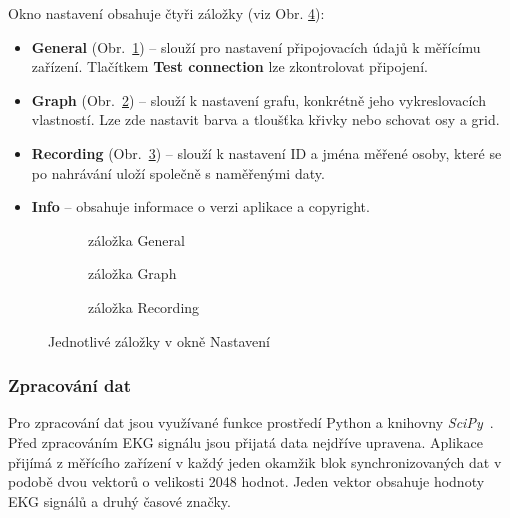 Okno nastavení obsahuje čtyři záložky (viz Obr. \ref{fig:settings_cards}):
\begin{itemize}
    \item \textbf{General} (Obr.~\ref{fig:settings_general}) -- slouží pro
          nastavení připojovacích údajů k měřícímu zařízení. Tlačítkem \textbf{Test
              connection} lze zkontrolovat připojení.
    \item \textbf{Graph} (Obr.~\ref{fig:settings_graph}) -- slouží k nastavení
          grafu, konkrétně jeho vykreslovacích vlastností. Lze zde nastavit barva a
          tloušťka křivky nebo schovat osy a grid.
    \item \textbf{Recording} (Obr.~\ref{fig:settings_recording}) -- slouží k
          nastavení ID a jména měřené osoby, které se po nahrávání uloží
          společně s naměřenými daty.
    \item \textbf{Info} -- obsahuje informace o verzi aplikace a copyright.
\end{itemize}

\begin{figure}[h]
    \centering
    \begin{subfigure}[t]{0.3\textwidth}
        \centering
        \textcolor{cyan}{\fboxrule=0.5pt\fboxsep=0pt}
        \caption{záložka General}
        \label{fig:settings_general}
    \end{subfigure}
    \hspace{5pt}
    \begin{subfigure}[t]{0.3\textwidth}
        \centering
        \textcolor{cyan}{\fboxrule=0.5pt\fboxsep=0pt}
        \caption{záložka Graph}
        \label{fig:settings_graph}
    \end{subfigure}
    \hspace{5pt}
    \begin{subfigure}[t]{0.3\textwidth}
        \centering
        \textcolor{cyan}{\fboxrule=0.5pt\fboxsep=0pt}
        \caption{záložka Recording}
        \label{fig:settings_recording}
    \end{subfigure}
    \caption{Jednotlivé záložky v okně Nastavení}
    \label{fig:settings_cards}
\end{figure}

\subsubsection{Zpracování dat}
\label{section:online_data_process}
Pro zpracování dat jsou využívané funkce prostředí Python a knihovny
\textit{SciPy}~\cite{SciPy2020}. Před zpracováním EKG signálu jsou přijatá data
nejdříve upravena. Aplikace přijímá z měřícího zařízení v každý jeden okamžik
blok synchronizovaných dat v podobě dvou vektorů o velikosti 2048 hodnot. Jeden
vektor obsahuje hodnoty EKG signálů a druhý časové značky. 

